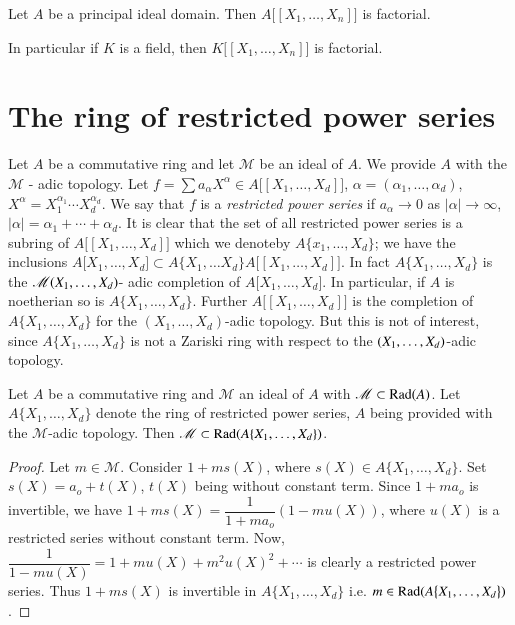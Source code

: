 \begin{coro*} %
Let $A$ be a principal ideal domain. Then $A \big[[X_1, \ldots , X_n
  ]\big]$ is factorial.  
    \end{coro*}    
    
    In particular if $K$ is a field, then $K \big[[X_1, \ldots , X_n
      ]\big]$ is factorial. 

    
\section{The ring of restricted power series}\label{chap2:sec3}%
 Let $A$ be a commutative ring and let $\mathscr{M}$ be an ideal of
 $A$. We provide $A$ with the $\mathscr{M}$ - adic topology. Let $f =
 \sum a_\alpha X^\alpha \in A \big[[X_1, \ldots , X_d]\big]$,
 $\alpha = (\alpha_1, \ldots , \alpha_d)$, $X^\alpha = X^{\alpha_1}_1
 \cdots X^{\alpha_d}_d$. We say that $f$ is a \textit{restricted
   power series} if $a_\alpha \rightarrow 0$ as $| \alpha |
 \rightarrow \infty$, $| \alpha | = \alpha_1 + \cdots + \alpha_d$. It is
 clear that the set of all restricted power series is a subring of $A
 \big[[X_1 , \ldots , X_d]\big]$ which we denote\pageoriginale by $A
 \big \{x_1, 
 \ldots , X_d \big\}$; we have the inclusions $A \big[X_1, \ldots ,
   X_d \big] \subset A \{X_1, \ldots X_d\} A \big[[X_1, \ldots ,
     X_d]\big]$. In fact $A \big\{X_1, \ldots , X_d\big \}$ is the
 $\mathscr{M} (X_1, \ldots,\break X_d)$- adic completion of $A \big[X_1,
   \ldots , X_d \big]$. In particular, if $A$ is noetherian so is $A
 \big\{X_1, \ldots , X_d \big\}$. Further $A \big[[X_1, \ldots ,
     X_d]\big]$ is the completion of $A \big\{X_1, \ldots , X_d
 \big\}$ for the $(X_1, \ldots , X_d)$-adic topology. But this is not
 of interest, since $A \big \{X_1, \ldots , X_d \big\}$ is not a
 Zariski ring with respect to the $(X_1, \ldots,\break X_d)$-adic
 topology. 
 
\begin{lemma}\label{chap2:lem3.1} %
Let $A$ be a commutative ring and $\mathscr{M}$ an ideal of $A$ with
$\mathscr{M} \subset \operatorname{Rad} (A)$. Let $A \big\{X_1, \ldots , X_d
\big\}$ denote the ring of restricted power series, $A$ being provided 
with the $\mathscr{M}$-adic topology. Then $\mathscr{M} \subset \operatorname{Rad}
(A \{ X_1, \ldots, X_d\})$. 
\end{lemma}  
      
    \begin{proof}
Let $m \in \mathscr{M}$. Consider $1+ ms (X)$, where $s (X) \in A \big
\{X_1, \ldots , X_d \big\}$. Set $s(X) = a_o + t(X)$, $t(X)$ being
without constant term. Since $1+ m a_o$ is invertible, we have $1 + ms
(X) = \dfrac{1}{1+ ma_o} (1- mu (X))$, where $u(X)$ is a restricted
series without constant term. Now, $\dfrac{1}{1-mu (X)}= 1+mu (X) +
m^2 u(X)^2 +  \cdots $ is clearly a restricted power series. Thus $1 +
ms (X)$ is invertible in $A \big\{X_1, \ldots , X_d \big\} $ i.e. $m
\in \operatorname{Rad} (A \big\{X_1, \ldots , X_d \big\})$. 
    \end{proof}  
    
